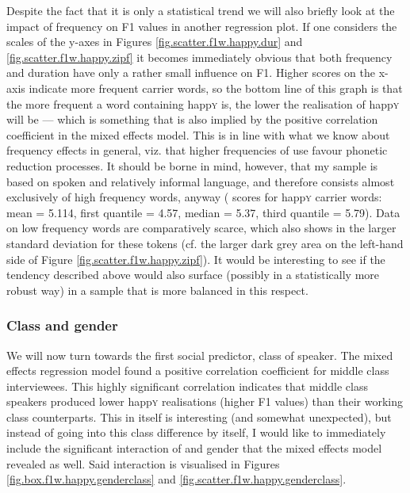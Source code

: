 Despite the fact that it is only a statistical trend we will also briefly look at the impact of frequency on F1 values in another regression plot.
If one considers the scales of the y-axes in Figures \ref{fig.scatter.f1w.happy.dur} and \ref{fig.scatter.f1w.happy.zipf} it becomes immediately obvious that both frequency and duration have only a rather small influence on F1.
Higher  scores on the x-axis indicate more frequent carrier words, so the bottom line of this graph is that the more frequent a word containing happ\textsc{y} is, the lower the realisation of happ\textsc{y} will be --- which is something that is also implied by the positive correlation coefficient in the mixed effects model.
This is in line with what we know about frequency effects in general, viz. that higher frequencies of use favour phonetic reduction processes.
It should be borne in mind, however, that my sample is based on spoken and relatively informal language, and therefore consists almost exclusively of high frequency words, anyway ( scores for happ\textsc{y} carrier words: mean = 5.114, first quantile = 4.57, median = 5.37, third quantile = 5.79).
Data on low frequency words are comparatively scarce, which also shows in the larger standard deviation for these tokens (cf. the larger dark grey area on the left-hand side of Figure \ref{fig.scatter.f1w.happy.zipf}).
It would be interesting to see if the tendency described above would also surface (possibly in a statistically more robust way) in a sample that is more balanced in this respect.

			\subsubsection{Class and gender}
			\label{sec.prod.res.vow.happy.f1.classgender}

We will now turn towards the first social predictor, class of speaker.
The mixed effects regression model found a positive correlation coefficient for middle class interviewees.
This highly significant correlation indicates that middle class speakers produced lower happ\textsc{y} realisations (higher F1 values) than their working class counterparts.
This in itself is interesting (and somewhat unexpected), but instead of going into this class difference by itself, I would like to immediately include the significant interaction of  and gender that the mixed effects model revealed as well.
Said interaction is visualised in Figures \ref{fig.box.f1w.happy.genderclass} and \ref{fig.scatter.f1w.happy.genderclass}.


